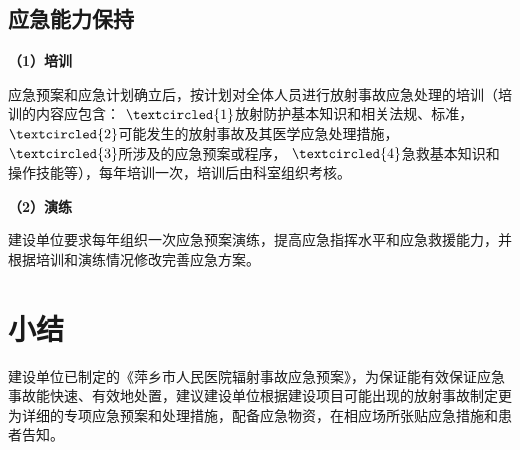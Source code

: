 \subsection{应急能力保持}

\textbf{（1）培训}

应急预案和应急计划确立后，按计划对全体人员进行放射事故应急处理的培训（培训的内容应包含： $\textcircled{1}$放射防护基本知识和相关法规、标准， $\textcircled{2}$可能发生的放射事故及其医学应急处理措施， $\textcircled{3}$所涉及的应急预案或程序， $\textcircled{4}$急救基本知识和操作技能等），每年培训一次，培训后由科室组织考核。

\textbf{（2）演练}

建设单位要求每年组织一次应急预案演练，提高应急指挥水平和应急救援能力，并根据培训和演练情况修改完善应急方案。

\section{小结}

建设单位已制定的《萍乡市人民医院辐射事故应急预案》，为保证能有效保证应急事故能快速、有效地处置，建议建设单位根据建设项目可能出现的放射事故制定更为详细的专项应急预案和处理措施，配备应急物资，在相应场所张贴应急措施和患者告知。
